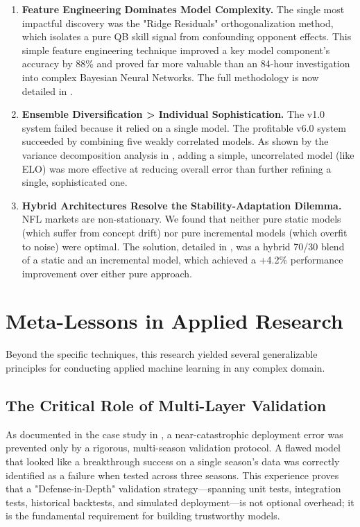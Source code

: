 \begin{enumerate}
    \item \textbf{Feature Engineering Dominates Model Complexity.} The single most impactful discovery was the "Ridge Residuals" orthogonalization method, which isolates a pure QB skill signal from confounding opponent effects. This simple feature engineering technique improved a key model component's accuracy by 88\% and proved far more valuable than an 84-hour investigation into complex Bayesian Neural Networks. The full methodology is now detailed in .

    \item \textbf{Ensemble Diversification > Individual Sophistication.} The v1.0 system failed because it relied on a single model. The profitable v6.0 system succeeded by combining five weakly correlated models. As shown by the variance decomposition analysis in , adding a simple, uncorrelated model (like ELO) was more effective at reducing overall error than further refining a single, sophisticated one.

    \item \textbf{Hybrid Architectures Resolve the Stability-Adaptation Dilemma.} NFL markets are non-stationary. We found that neither pure static models (which suffer from concept drift) nor pure incremental models (which overfit to noise) were optimal. The solution, detailed in , was a hybrid 70/30 blend of a static and an incremental model, which achieved a +4.2\% performance improvement over either pure approach.
\end{enumerate}

\section{Meta-Lessons in Applied Research}

Beyond the specific techniques, this research yielded several generalizable principles for conducting applied machine learning in any complex domain.

\subsection{The Critical Role of Multi-Layer Validation}

As documented in the case study in , a near-catastrophic deployment error was prevented only by a rigorous, multi-season validation protocol. A flawed model that looked like a breakthrough success on a single season's data was correctly identified as a failure when tested across three seasons. This experience proves that a "Defense-in-Depth" validation strategy—spanning unit tests, integration tests, historical backtests, and simulated deployment—is not optional overhead; it is the fundamental requirement for building trustworthy models.

